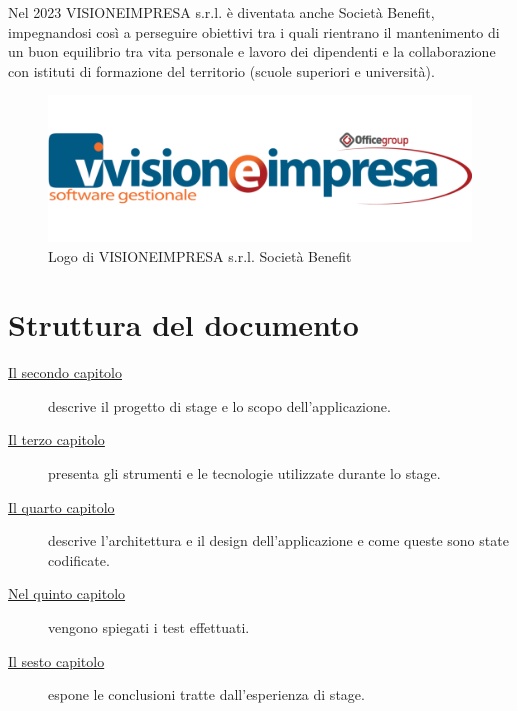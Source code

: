 Nel 2023 VISIONEIMPRESA s.r.l. è diventata anche \gls{Società Benefit}\glsfirstoccur, impegnandosi così a perseguire obiettivi tra i quali rientrano il mantenimento di un buon equilibrio tra vita personale e lavoro dei dipendenti e la collaborazione con istituti di formazione del territorio (scuole superiori e università).

\begin{figure}[!h]
    \centering 
    \includegraphics[width=0.7\columnwidth]{images/logo-visioneimpresa.png} 
    \caption{Logo di VISIONEIMPRESA s.r.l. Società Benefit}
\end{figure}

\section{Struttura del documento}


\begin{description} 
    \item[{\hyperref[cap:descrizione-stage]{Il secondo capitolo}}] descrive il progetto di stage e lo scopo dell'applicazione.
    
    \item[{\hyperref[cap:tecnologie-strumenti]{Il terzo capitolo}}] presenta gli strumenti e le tecnologie utilizzate durante lo stage.
    
    \item[{\hyperref[cap:progettazione-codifica]{Il quarto capitolo}}] descrive l'architettura e il design dell'applicazione e come queste sono state codificate.
    
    \item[{\hyperref[cap:verifica-validazione]{Nel quinto capitolo}}] vengono spiegati i test effettuati.
    
    \item[{\hyperref[cap:conclusioni]{Il sesto capitolo}}] espone le conclusioni tratte dall'esperienza di stage.
\end{description}
